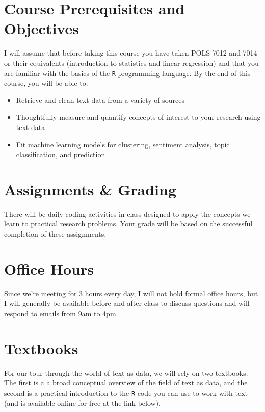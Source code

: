 \documentclass[11pt, letterpaper]{article}
\begin{document}
\section*{Course Prerequisites and Objectives}
I will assume that before taking this course you have taken POLS 7012 and 7014 or their equivalents (introduction to statistics and linear regression) and that you are familiar with the basics of the \texttt{R} programming language. By the end of this course, you will be able to:
\begin{itemize}
	\item Retrieve and clean text data from a variety of sources
	\item Thoughtfully measure and quantify concepts of interest to your research using text data
	\item Fit machine learning models for clustering, sentiment analysis, topic classification, and prediction
\end{itemize}


\section*{Assignments \& Grading}

There will be daily coding activities in class designed to apply the concepts we learn to practical research problems. Your grade will be based on the successful completion of these assignments. 

\section*{Office Hours}

Since we're meeting for 3 hours every day, I will not hold formal office hours, but I will generally be available before and after class to discuss questions and will respond to emails from 9am to 4pm.

\section*{Textbooks}

For our tour through the world of text as data, we will rely on two textbooks. The first is a a broad conceptual overview of the field of text as data, and the second is a practical introduction to the \texttt{R} code you can use to work with text (and is available online for free at the link below).
\end{document}
